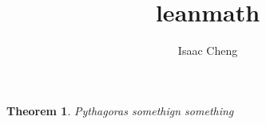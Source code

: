 \documentclass{report}
\title{leanmath}
\author{Isaac Cheng}
\newtheorem{theorem}{Theorem}
\begin{document}
\maketitle
\begin{theorem}
    Pythagoras somethign something
\end{theorem}
\end{document}
